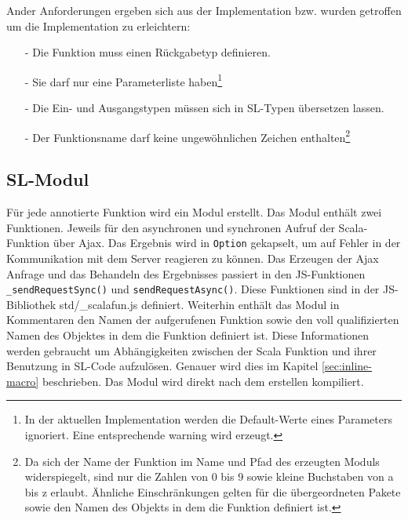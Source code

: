 \documentclass[12pt]{scrreprt}
\begin{document}
Ander Anforderungen ergeben sich aus der Implementation bzw. wurden getroffen um die Implementation zu erleichtern:
\begin{itemize}
 \item[-]{Die Funktion muss einen Rückgabetyp definieren.}
 \item[-]{Sie darf nur eine Parameterliste haben\footnote{In der aktuellen Implementation werden die Default-Werte eines Parameters ignoriert. Eine entsprechende warning wird erzeugt.}}
 \item[-]{Die Ein- und Ausgangstypen müssen sich in \ac{SL}-Typen übersetzen lassen.}
 \item[-]{Der Funktionsname darf keine ungewöhnlichen Zeichen enthalten\footnote{Da sich der Name der Funktion im Name und Pfad des erzeugten Moduls widerspiegelt, sind nur die Zahlen von 0 bis 9 sowie kleine Buchstaben von a bis z erlaubt. Ähnliche Einschränkungen gelten für die übergeordneten Pakete sowie den Namen des Objekts in dem die Funktion definiert ist.}}
\end{itemize}

\subsection{SL-Modul}
\label{subsec:sl-modul}

Für jede annotierte Funktion wird ein Modul erstellt. Das Modul enthält zwei Funktionen. Jeweils für den asynchronen und synchronen Aufruf der Scala-Funktion über Ajax. Das Ergebnis wird in \lstinline!Option! gekapselt, um auf Fehler in der Kommunikation mit dem Server reagieren zu können. Das Erzeugen der Ajax Anfrage und das Behandeln des Ergebnisses passiert in den \ac{JS}-Funktionen \lstinline!_sendRequestSync()! und \lstinline!sendRequestAsync()!. Diese Funktionen sind in der \ac{JS}-Bibliothek std/\_scalafun.js definiert. Weiterhin enthält das Modul in Kommentaren den Namen der aufgerufenen Funktion sowie den voll qualifizierten Namen des Objektes in dem die Funktion definiert ist. Diese Informationen werden gebraucht um Abhängigkeiten zwischen der Scala Funktion und ihrer Benutzung in \ac{SL}-Code aufzulösen. Genauer wird dies im Kapitel \ref{sec:inline-macro} beschrieben. Das Modul wird direkt nach dem erstellen kompiliert.
\end{document}
